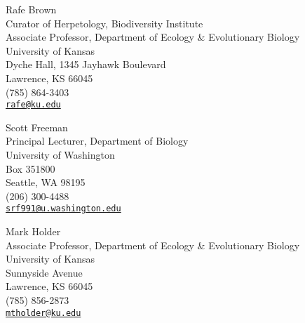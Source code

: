 Rafe Brown \\
\myIndent Curator of Herpetology, Biodiversity Institute \\
\myIndent Associate Professor, Department of Ecology \& Evolutionary Biology \\
\myIndent University of Kansas \\
\myIndent Dyche Hall, 1345 Jayhawk Boulevard \\
\myIndent Lawrence, KS 66045 \\
\myIndent (785) 864-3403 \\
\myIndent \href{mailto:rafe@ku.edu}{\tt rafe@ku.edu}

Scott Freeman \\
\myIndent Principal Lecturer, Department of Biology \\
\myIndent University of Washington \\
\myIndent Box 351800 \\
\myIndent Seattle, WA 98195\\
\myIndent (206) 300-4488 \\
\myIndent \href{mailto:srf991@u.washington.edu}{\tt srf991@u.washington.edu}

Mark Holder \\
\myIndent Associate Professor, Department of Ecology \& Evolutionary Biology \\
\myIndent University of Kansas \\
 Sunnyside Avenue \\
\myIndent Lawrence, KS 66045 \\
\myIndent (785) 856-2873 \\
\myIndent \href{mailto:mtholder@ku.edu}{\tt mtholder@ku.edu}




